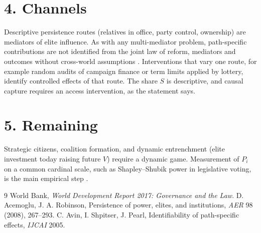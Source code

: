\documentclass[11pt]{article}
\theoremstyle{definition}
\begin{document}
\section*{4. Channels}
Descriptive persistence routes (relatives in office, party control, ownership) are mediators of elite influence. As with
any multi-mediator problem, path-specific contributions are not identified from the joint law of reform, mediators and
outcomes without cross-world assumptions \cite{asp}. Interventions that vary one route, for example random audits of
campaign finance or term limits applied by lottery, identify controlled effects of that route. The share $S$ is descriptive,
and causal capture requires an access intervention, as the statement says.

\section*{5. Remaining}
Strategic citizens, coalition formation, and dynamic entrenchment (elite investment today raising future $V$) require a
dynamic game. Measurement of $P_i$ on a common cardinal scale, such as Shapley--Shubik power in legislative voting, is the main
empirical step \cite{wdr}.

\begin{thebibliography}{9}
 World Bank, \emph{World Development Report 2017: Governance and the Law}.
 D. Acemoglu, J. A. Robinson, Persistence of power, elites, and institutions, \emph{AER} 98 (2008), 267--293.
 C. Avin, I. Shpitser, J. Pearl, Identifiability of path-specific effects, \emph{IJCAI} 2005.
\end{thebibliography}
\end{document}
